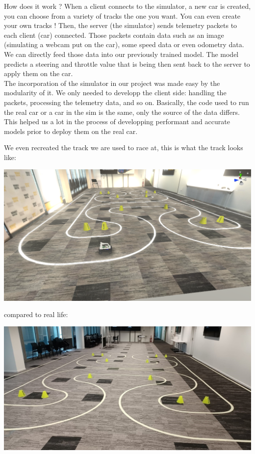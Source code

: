 \documentclass[12pt]{article}
\begin{document}
How does it work ?
When a client connects to the simulator, a new car is created, you can choose from a variety of tracks the one you want. You can even create your own tracks ! Then, the server (the simulator) sends telemetry packets to each client (car) connected. Those packets contain data such as an image (simulating a webcam put on the car), some speed data or even odometry data. We can directly feed those data into our previously trained model. The model predicts a steering and throttle value that is being then sent back to the server to apply them on the car. \\

The incorporation of the simulator in our project was made easy by the modularity of it. We only needed to developp the client side: handling the packets, processing the telemetry data, and so on. Basically, the code used to run the real car or a car in the sim is the same, only the source of the data differs. This helped us a lot in the process of developping performant and accurate models prior to deploy them on the real car.

We even recreated the track we are used to race at, this is what the track looks like: \\
\newpage
\centerline{\includegraphics[width=15cm]{../../docs/simulator.png}}
compared to real life: \\
\centerline{\includegraphics[width=15cm]{../../docs/track-irl.png}}
\end{document}
